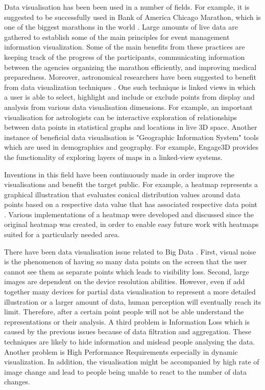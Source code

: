 \documentclass{l4proj}
\begin{document}
Data visualisation has been been used in a number of fields. For example, it is suggested to be successfully used in Bank of America Chicago Marathon, which is one of the biggest marathons in the world \cite{hanken2016developing}. Large amounts of live data are gathered to establish some of the main principles for event management information visualization. Some of the main benefits from these practices are keeping track of the progress of the participants, communicating information between the agencies organizing the marathon efficiently, and improving medical preparedness. Moreover, astronomical researchers have been suggested to benefit from data visualization techniques \cite{goodman2012principles}. One such technique is linked views in which a user is able to select, highlight and include or exclude points from display and analysis from various data visualisation dimensions. For example, an important visualisation for astrologists can be interactive exploration of relationships between data points in statistical graphs and locations in live 3D space. Another instance of beneficial data visualisation is "Geographic Information System" tools which are used in demographics and geography. For example, Engage3D provides the functionality of exploring layers of maps in a linked-view systems. 

Inventions in this field have been continuously made in order improve the visualisations and benefit the target public. For example, a heatmap represents a graphical illustration that evaluates conical distribution values around data points based on a respective data value that has associated respective data point \cite{cardno2014data}. Various implementations of a heatmap were developed and discussed since the original heatmap was created, in order to enable easy future work with heatmaps suited for a particularly needed area.

There have been data visualisation issue related to Big Data \cite{gorodov2013analytical}. First, visual noise is the phenomenon of having so many data points on the screen that the user cannot see them as separate points which leads to visibility loss. Second, large images are dependent on the device resolution abilities. However, even if add together many devices for partial data visualisation to represent a more detailed illustration or a larger amount of data, human perception will eventually reach its limit. Therefore, after a certain point people will not be able understand the representations or their analysis. A third problem is Information Loss which is caused by the previous issues because of data filtration and aggregation. These techniques are likely to hide information and mislead people analysing the data. Another problem is High Performance Requirements especially in dynamic visualization. In addition, the visualisation might be accompanied by high rate of image change and lead to people being unable to react to the number of data changes. 
\end{document}

